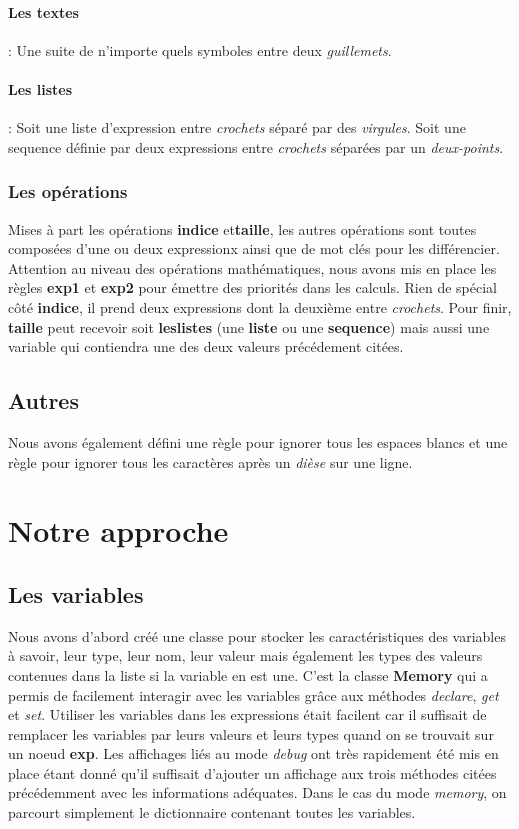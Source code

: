 \paragraph{Les textes}: Une suite de n'importe quels symboles entre deux \textit{guillemets}.

\paragraph{Les listes}: Soit une liste d'expression entre \textit{crochets} séparé par des \textit{virgules}.
Soit une sequence définie par deux expressions entre \textit{crochets} séparées par un \textit{deux-points}.

\subsubsection{Les opérations}
Mises à part les opérations \textbf{indice} et\textbf{taille}, les autres opérations sont toutes composées d'une ou deux expressionx
ainsi que de mot clés pour les différencier. Attention au niveau des opérations mathématiques, nous avons mis en place les règles \textbf{exp1} et \textbf{exp2}
pour émettre des priorités dans les calculs.
Rien de spécial côté \textbf{indice}, il prend deux expressions dont la deuxième entre \textit{crochets}.
Pour finir, \textbf{taille} peut recevoir soit \textbf{leslistes} (une \textbf{liste} ou une \textbf{sequence})
mais aussi une variable qui contiendra une des deux valeurs précédement citées.

\subsection{Autres}
Nous avons également défini une règle pour ignorer tous les espaces blancs et une règle pour ignorer tous les caractères après un \textit{dièse} sur une ligne.

\section{Notre approche}
\subsection{Les variables}
Nous avons d'abord créé une classe pour stocker les caractéristiques des variables à savoir, leur type, leur nom, leur valeur
mais également les types des valeurs contenues dans la liste si la variable en est une.
C'est la classe \textbf{Memory} qui a permis de facilement interagir avec les variables grâce aux méthodes \textit{declare}, \textit{get} et \textit{set}.
Utiliser les variables dans les expressions était facilent car il suffisait de remplacer les variables par leurs valeurs et leurs types
quand on se trouvait sur un noeud \textbf{exp}.
Les affichages liés au mode \textit{debug} ont très rapidement été mis en place étant donné qu'il suffisait d'ajouter
un affichage aux trois méthodes citées précédemment avec les informations adéquates.
Dans le cas du mode \textit{memory}, on parcourt simplement le dictionnaire contenant toutes les variables.

